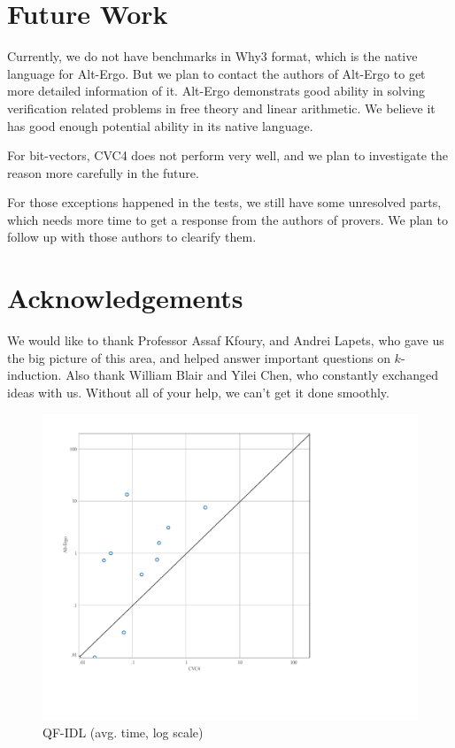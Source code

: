 \documentclass[10pt,letter]{article}
\theoremstyle{definition}
\begin{document}
\section{Future Work}

Currently, we do not have benchmarks in Why3 format, which is the native language for Alt-Ergo. But we plan to contact the authors of Alt-Ergo to get more detailed information of it. Alt-Ergo demonstrats good ability in solving verification related problems in free theory and linear arithmetic. We believe it has good enough potential ability in its native language.

For bit-vectors, CVC4 does not perform very well, and we plan to investigate the reason more carefully in the future.

For those exceptions happened in the tests, we still have some unresolved parts, which needs more time to get a response from the authors of provers. We plan to follow up with those authors to clearify them.

\section{Acknowledgements}

We would like to thank Professor Assaf Kfoury, and Andrei Lapets, who gave us the big picture of this area, and helped answer important questions on $k$-induction. Also thank William Blair and Yilei Chen, who constantly exchanged ideas with us. Without all of your help, we can't get it done smoothly.

\twocolumn
\begin{figure}
\centering
\includegraphics[scale=0.42,trim=0.6cm 0.4cm 0cm 0.0cm,clip=true]{./testanalysis/ScatterQFIDL.pdf}
\caption{QF-IDL (avg. time, log scale)}
\label{f:qfidl}
\end{figure}
\end{document}
